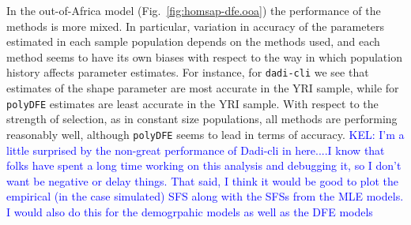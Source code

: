 \documentclass[hidelinks]{article}
\newcommand{\polydfe}{\texttt{polyDFE}\xspace}
\newcommand{\dadicli}{\texttt{dadi-cli}\xspace}
\newcommand{\kelcomment}[1]{\textcolor{blue}{KEL: #1}}
\begin{document}
    In the out-of-Africa model (Fig.~\ref{fig:homsap-dfe.ooa}) the performance of the methods is more mixed. 
    In particular, variation in accuracy of the parameters estimated in each
    sample population depends on the methods used, and each method seems to 
    have its own biases with respect to the way in which population history 
    affects parameter estimates. For instance, for \dadicli we see that estimates of 
    the shape parameter are most accurate in the YRI sample, while for \polydfe
    estimates are least accurate in the YRI sample. 
    With respect to the strength of selection, as in constant size populations,
    all methods are performing reasonably well, although \polydfe seems to
    lead in terms of accuracy.
\kelcomment{I'm a little surprised by the non-great performance of Dadi-cli in here....I know that folks have spent a long time working on this analysis and debugging it, so I don't want be negative or delay things. That said, I think it would be good to plot the empirical (in the case simulated) SFS along with the SFSs from the MLE models. I would also do this for the demogrpahic models as well as the DFE models}
\end{document}
